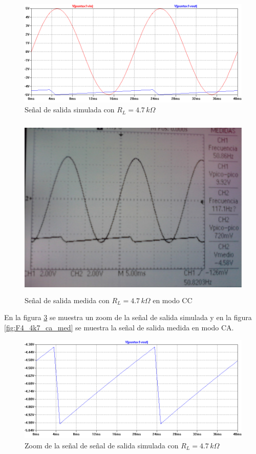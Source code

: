\documentclass[10pt,spanish,a4paper,openany,notitlepage]{article}
\begin{document}
\begin{enumerate}
    \begin{figure}[H]
    \centering
    \includegraphics[scale=0.65]{simulaciones/F4_vo_RL-4k7.png}
    \caption{Señal de salida simulada con $R_L = 4.7\,\unit{k\Omega}$}
    \label{fig:F4_4k7_cc_sim}
    \end{figure}
    
    \begin{figure}[H]
    \centering
    \includegraphics[width=350pt, height=250pt]{mediciones/F4-4K7.jpg}
    \caption{Señal de salida medida con $R_L = 4.7\,\unit{k\Omega}$ en modo CC}
    \label{fig:F4_4k7_cc_med}
    \end{figure}
    
    
    En la figura \ref{fig:F4_4k7_ca_sim} se muestra un zoom de la señal de salida simulada y en
    la figura \ref{fig:F4_4k7_ca_med} se muestra la señal de salida medida en modo CA.
    
    \begin{figure}[H]
    \centering
    \includegraphics[scale=0.65]{simulaciones/F4_vo_RL-4k7_zoom.png}
    \caption{Zoom de la señal de señal de salida simulada con $R_L = 4.7\,\unit{k\Omega}$}
    \label{fig:F4_4k7_ca_sim}
    \end{figure}
    

\end{enumerate}
\end{document}
